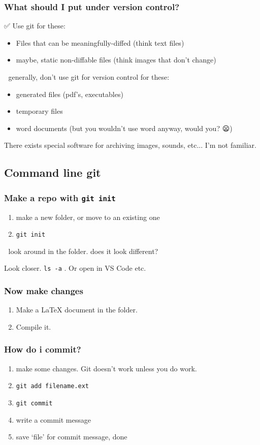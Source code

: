 \documentclass[14pt,aspectratio=1610]{beamer} %
\newcommand{\fframe}[2]{
   \begin{frame}
\frametitle{#1}
#2
\end{frame}
}
\begin{document}
\fframe{What should I put under version control?}
{
	✅ Use git for these:
	\begin{itemize}
		\item Files that can be meaningfully-diffed (think text files)
		\item maybe, static non-diffable files (think images that don't change)
	\end{itemize}

\vspace{\baselineskip}

	🚫 generally, don't use git for version control for these:
	\begin{itemize}
		\item generated files (pdf's, executables)
		\item temporary files
		\item word documents (but you wouldn't use word anyway, would you? 😦)
	\end{itemize}

	There exists special software for archiving images, sounds, etc... I'm not familiar.
}


\subsection{Command line git}

\fframe{Make a repo with \texttt{git init}}
{
	\begin{enumerate}
		\item make a new folder, or move to an existing one
		\item {\tt git init}
	\end{enumerate}

\vspace{\baselineskip}

👀	look around in the folder.  does it look different?

Look closer.  {\tt ls -a} .  Or open in VS Code etc.
}


\fframe{Now make changes}
{
\begin{enumerate}
	\item Make a LaTeX document in the folder.
	\item Compile it.
\end{enumerate}
}

\fframe{How do i commit?}
{
	\begin{enumerate}
		\item make some changes.  Git doesn't work unless you do work.
		\item {\tt git add filename.ext}
		\item {\tt git commit}
		\item write a commit message
		\item save `file' for commit message, done
	\end{enumerate}
}
\end{document}
